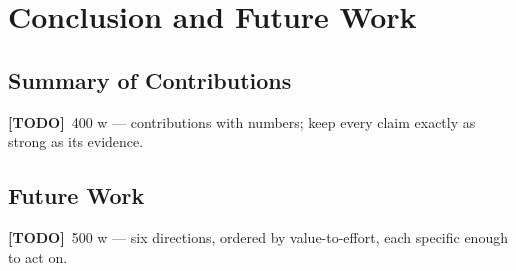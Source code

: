 \documentclass[11pt,a4paper]{report}
\newcommand{\todo}[1]{\par\noindent\textcolor{red!70!black}{\small\textbf{[TODO]}~#1}\par}
\begin{document}
\chapter{Conclusion and Future Work}
\label{ch:conclusion}

\section{Summary of Contributions}
\label{sec:conc-summary}
\todo{400 w — contributions with numbers; keep every claim exactly as strong as its evidence.}

\section{Future Work}
\label{sec:conc-future}
\todo{500 w — six directions, ordered by value-to-effort, each specific enough to act on.}
\end{document}
